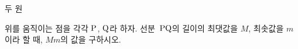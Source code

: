 두 원\par\smallskip{}\par\smallskip\noindent 위를 움직이는 점을 각각 $\mathrm{P}$, $\mathrm{Q}$라 하자. 선분~$\mathrm{PQ}$의 길이의 최댓값을 $M$, 최솟값을 $m$이라 할 때, $Mm$의 값을 구하시오.
